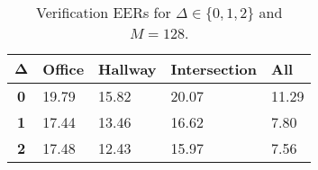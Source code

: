 \begin{table}[h]
    \centering
    \begin{tabular}{|c|M{2cm}|M{2cm}|M{2cm}|M{2cm}|}
    \hline
    $\boldsymbol{\Delta}$ & \bf{Office} & \bf{Hallway} & \bf{Intersection} & \bf{All} \\ 
    \hline 
    \hline
    \bf{0} & 19.79 & 15.82 & 20.07 & 11.29 \\
    \hline
    \bf{1} & 17.44 & 13.46 & 16.62 & 7.80 \\
    \hline
    \bf{2} & 17.48 & 12.43 & 15.97 & 7.56 \\
    \hline
    \end{tabular}
    \caption{Verification EERs for $\Delta \in \{0, 1, 2\}$ and $M = 128$.}
    \label{tab:verify_adapted_m_M_128}
\end{table}
